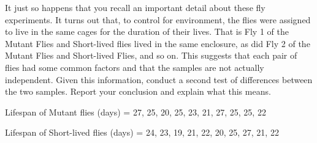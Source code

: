 \documentclass[onecolumn,10pt]{jhwhw}
\begin{document}
\problem{}
It just so happens that you recall an important detail about these fly experiments. It turns out that, to control for environment, the flies were assigned to live in the same cages for the duration of their lives. That is Fly 1 of the Mutant Flies and Short-lived flies lived in the same enclosure, as did Fly 2 of the Mutant Flies and Short-lived Flies, and so on. This suggests that each pair of flies had some common factors and that the samples are not actually independent. Given this information, conduct a second test of differences between the two samples. Report your conclusion and explain what this means.

Lifespan of Mutant flies (days) = {27, 25, 20, 25, 23, 21, 27, 25, 25, 22}

Lifespan of Short-lived flies (days) = {24, 23, 19, 21, 22, 20, 25, 27, 21, 22}
\end{document}
